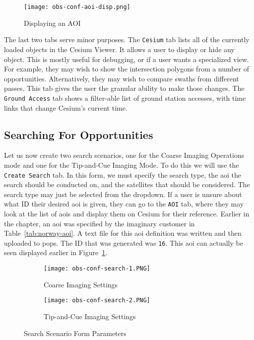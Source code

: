 \begin{figure}[h]
    \centering
    \texttt{[image: obs-conf-aoi-disp.png]} 
    \caption{Displaying an AOI}
    \label{fig:obs-conf-aoi-display} 
\end{figure}

The last two tabs serve minor purposes. The \texttt{Cesium} tab lists all of
the currently loaded objects in the Cesium Viewer. It allows a user to display
or hide any object. This is mostly useful for debugging, or if a user wants a
specialized view. For example, they may wish to show the intersection polygons
from a number of opportunities. Alternatively, they may wish to compare swaths
from different passes. This tab gives the user the granular ability to make
those changes. The \texttt{Ground Access} tab shows a filter-able list of
ground station accesses, with time links that change Cesium's current time.


\subsection{Searching For Opportunities}

Let us now create two search scenarios, one for the Coarse Imaging Operations
mode and one for the Tip-and-Cue Imaging Mode. To do this we will use the
\texttt{Create Search} tab. In this form, we must specify the search type, the
\gls{aoi} the search should be conducted on, and the  satellites that should be
considered. The search type may just be selected from the dropdown. If a user
is unsure about what ID their desired \gls{aoi} is given, they can go to the
\texttt{AOI} tab, where they may look at the list of \glspl{aoi} and display
them on Cesium for their reference. Earlier in the chapter, an \gls{aoi} was
specified by the imaginary customer in Table~\ref{tab:norway-aoi}. A text file
for this \gls{aoi} definition was written and then uploaded to \gls{pops}. The
ID that was generated was \texttt{16}. This \gls{aoi} can actually be seen
displayed earlier in Figure~\ref{fig:obs-conf-aoi-display}.

\begin{figure}[h]
    \centering
    \begin{subfigure}[b]{0.49\textwidth}
	\centering
	\texttt{[image: obs-conf-search-1.PNG]} 
	\caption{Coarse Imaging Settings}
	\label{fig:obs-conf-search-1} 
    \end{subfigure}
    \hfill
    \begin{subfigure}[b]{0.49\textwidth}
	\centering
	\texttt{[image: obs-conf-search-2.PNG]} 
	\caption{Tip-and-Cue Imaging Settings}
	\label{fig:obs-conf-search-2} 
    \end{subfigure}
    \caption{Search Scenario Form Parameters}
    \label{fig:obs-conf-searches} 
\end{figure}


